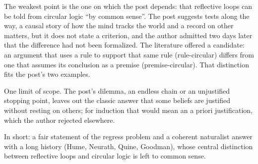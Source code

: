 \begin{afterword}
The weakest point is the one on which the post depends: that reflective loops can be told from circular logic ``by common sense''. The post suggests tests along the way, a causal story of how the mind tracks the world and a record on other matters, but it does not state a criterion, and the author admitted two days later that the difference had not been formalized. The literature offered a candidate: an argument that uses a rule to support that same rule (rule-circular) differs from one that assumes its conclusion as a premise (premise-circular). That distinction fits the post's two examples.

One limit of scope. The post's dilemma, an endless chain or an unjustified stopping point, leaves out the classic answer that some beliefs are justified without resting on others; for induction that would mean an a priori justification, which the author rejected elsewhere.

In short: a fair statement of the regress problem and a coherent naturalist answer with a long history (Hume, Neurath, Quine, Goodman), whose central distinction between reflective loops and circular logic is left to common sense.
\end{afterword}
